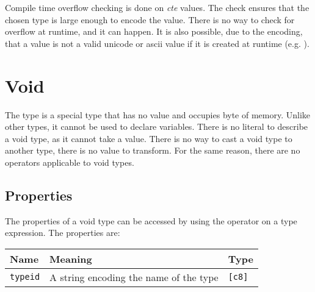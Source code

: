 Compile time overflow checking is done on \textit{cte} values. The check ensures
that the chosen type is large enough to encode the value. There is no way to
check for overflow at runtime, and it can happen. It is also possible, due to
the encoding, that a value is not a valid unicode or ascii value if it is
created at runtime (e.g. ).

\section{Void}
\label{sec:org409c2d8}

The  type is a special type that has no value and occupies
 byte of memory. Unlike other types, it cannot be used to declare
variables. There is no literal to describe a void type, as it cannot take a
value. There is no way to cast a void type to another type, there is no value to
transform. For the same reason, there are no operators applicable to void types.

\vspace{-10pt}
\subsection{Properties}
\label{sec:orgffa98ee}

The properties of a void type can be accessed by using the \token{::} operator
on a type expression. The properties are:

\begin{center}
  \vspace{-5pt}
  \begin{adjustbox}{max width=\linewidth}
    \begin{tabular}{|l|ll|}
      \hline
      Name & Meaning & Type\\[0pt]
      \hline
      \hline
      \texttt{typeid} & A string encoding the name of the type & \texttt{[c8]}\\[0pt]
      \hline
    \end{tabular}
  \end{adjustbox}
\end{center}
